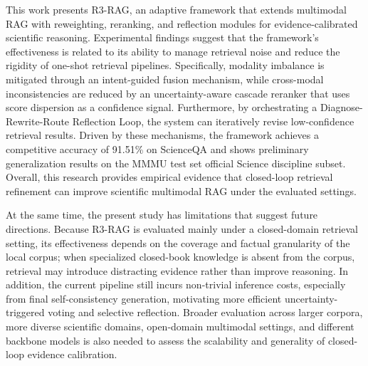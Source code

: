 \documentclass[a4paper, fleqn]{cas-dc}
\begin{document}
This work presents R3-RAG, an adaptive framework that extends multimodal RAG with reweighting, reranking, and reflection modules for evidence-calibrated scientific reasoning.
Experimental findings suggest that the framework's effectiveness is related to its ability to manage retrieval noise and reduce the rigidity of one-shot retrieval pipelines.
Specifically, modality imbalance is mitigated through an intent-guided fusion mechanism, while cross-modal inconsistencies are reduced by an uncertainty-aware cascade reranker that uses score dispersion as a confidence signal.
Furthermore, by orchestrating a Diagnose-Rewrite-Route Reflection Loop, the system can iteratively revise low-confidence retrieval results.
Driven by these mechanisms, the framework achieves a competitive accuracy of 91.51\% on ScienceQA and shows preliminary generalization results on the MMMU test set official Science discipline subset.
Overall, this research provides empirical evidence that closed-loop retrieval refinement can improve scientific multimodal RAG under the evaluated settings.

At the same time, the present study has limitations that suggest future directions.
Because R3-RAG is evaluated mainly under a closed-domain retrieval setting, its effectiveness depends on the coverage and factual granularity of the local corpus; when specialized closed-book knowledge is absent from the corpus, retrieval may introduce distracting evidence rather than improve reasoning.
In addition, the current pipeline still incurs non-trivial inference costs, especially from final self-consistency generation, motivating more efficient uncertainty-triggered voting and selective reflection.
Broader evaluation across larger corpora, more diverse scientific domains, open-domain multimodal settings, and different backbone models is also needed to assess the scalability and generality of closed-loop evidence calibration.



%






\end{document}
